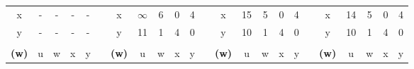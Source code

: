 \documentclass{article}
\begin{document}
\begin{latin}
\begin{table}[H]
\begin{tabular}{ccccccccccccccccccccccc}
\multicolumn{1}{|c|}{x}            & -                      & -                      & -                      & -                      & \multicolumn{1}{c|}{}                  & \multicolumn{1}{c|}{x}            & $\infty$               & 6                      & 0                      & 4                      & \multicolumn{1}{c|}{}                  & \multicolumn{1}{c|}{x}            & 15                     & 5                      & 0                      & 4                      & \multicolumn{1}{c|}{}                  & \multicolumn{1}{c|}{x}            & 14                     & 5                      & 0                      & 4                      \\ \cline{1-1} \cline{7-7} \cline{13-13} \cline{19-19}
\multicolumn{1}{|c|}{y}            & -                      & -                      & -                      & -                      & \multicolumn{1}{c|}{}                  & \multicolumn{1}{c|}{y}            & 11                     & 1                      & 4                      & 0                      & \multicolumn{1}{c|}{}                  & \multicolumn{1}{c|}{y}            & 10                     & 1                      & 4                      & 0                      & \multicolumn{1}{c|}{}                  & \multicolumn{1}{c|}{y}            & 10                     & 1                      & 4                      & 0                      \\ \cline{1-1} \cline{7-7} \cline{13-13} \cline{19-19}
                                   &                        &                        &                        &                        &                                        &                                   &                        &                        &                        &                        &                                        &                                   &                        &                        &                        &                        &                                        &                                   &                        &                        &                        &                        \\ \cline{1-5} \cline{7-11} \cline{13-17} \cline{19-23} 
\multicolumn{1}{|c|}{\textbf{(w)}} & \multicolumn{1}{c|}{u} & \multicolumn{1}{c|}{w} & \multicolumn{1}{c|}{x} & \multicolumn{1}{c|}{y} & \multicolumn{1}{c|}{}                  & \multicolumn{1}{c|}{\textbf{(w)}} & \multicolumn{1}{c|}{u} & \multicolumn{1}{c|}{w} & \multicolumn{1}{c|}{x} & \multicolumn{1}{c|}{y} & \multicolumn{1}{c|}{}                  & \multicolumn{1}{c|}{\textbf{(w)}} & \multicolumn{1}{c|}{u} & \multicolumn{1}{c|}{w} & \multicolumn{1}{c|}{x} & \multicolumn{1}{c|}{y} & \multicolumn{1}{c|}{}                  & \multicolumn{1}{c|}{\textbf{(w)}} & \multicolumn{1}{c|}{u} & \multicolumn{1}{c|}{w} & \multicolumn{1}{c|}{x} & \multicolumn{1}{c|}{y} \\ \cline{1-5} \cline{7-11} \cline{13-17} \cline{19-23} 

\end{tabular}
\end{table}
\end{latin}
\end{document}
